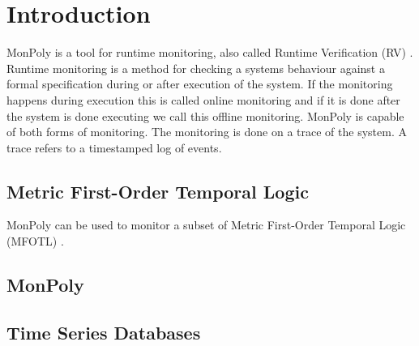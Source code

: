 \section{Introduction}

MonPoly \cite{Basin2017} is a tool for runtime monitoring, also called Runtime Verification (RV) \cite{Bartocci2018}.
Runtime monitoring is a method for checking a systems behaviour against a formal specification during or after execution of the system.
If the monitoring happens during execution this is called online monitoring and if it is done after the system is done executing we call this offline monitoring.
MonPoly is capable of both forms of monitoring.
The monitoring is done on a trace of the system.
A trace refers to a timestamped log of events.




\subsection{Metric First-Order Temporal Logic}
MonPoly can be used to monitor a subset of Metric First-Order Temporal Logic (MFOTL) \cite{Basin2015}.


\subsection{MonPoly}

\subsection{Time Series Databases}

